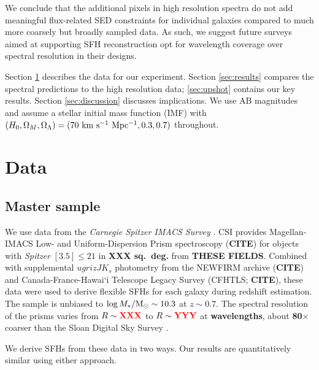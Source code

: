 \documentclass[a4paper,fleqn,usenatbib]{mnras}
\newcommand{\Msun}{{\rm M}_\odot}
\newcommand{\Mstel}{M_\ast}
\newcommand{\logM}{\log\Mstel/\Msun}
\newcommand{\bfr}{\bf\color{red}}
\newcommand{\CITE}{{\bfr CITE}}
\begin{document}
We conclude that the additional pixels in high resolution spectra do not add meaningful 
flux-related SED constraints for individual galaxies compared to much more coarsely 
but broadly sampled data.
As such, we suggest future surveys aimed at supporting SFH reconstruction opt for 
wavelength coverage over spectral resolution in their designs.

Section \ref{sec:data} describes the data for our experiment. Section \ref{sec:results} compares 
the spectral predictions to the high resolution data; \ref{sec:upshot} contains our key results. 
Section \ref{sec:discussion} discusses implications. We use AB magnitudes and assume 
a \citet{Chabrier03} stellar initial mass function (IMF) with $(H_{0}, \Omega_{M}, \Omega_{\Lambda}) =
(70~{\rm km~s^{-1}~Mpc^{-1}}, 0.3, 0.7)$ throughout.



\section{Data}
\label{sec:data}

\subsection{Master sample}
\label{sec:master}

We use data from the {\it Carnegie Spitzer IMACS Survey} \citep[CSI;][]{Kelson14a}. CSI provides
Magellan-IMACS Low- and Uniform-Dispersion Prism spectroscopy (\CITE) for objects with {\it Spitzer} 
$[3.5]\leq21$ in {\bfr XXX sq.~deg.} from {\bfr THESE FIELDS}. Combined with supplemental 
$ugrizJK_{s}$ photometry from the NEWFIRM archive (\CITE) and Canada-France-Hawai`i Telescope 
Legacy Survey (CFHTLS; \CITE), these data were used to derive flexible SFHs for each galaxy
during redshift estimation. The sample is unbiased to $\logM\sim10.3$ at $z\sim0.7$.
The spectral resolution of the prisms varies from $R\sim{\bfr XXX}$ to $R\sim{\bfr YYY}$ at
{\bfr wavelengths}, about {\bfr 80$\times$} coarser than the Sloan Digital Sky Survey \citep{York00}.

We derive SFHs from these data in two ways. Our results are quantitatively similar
using either approach.
\end{document}

